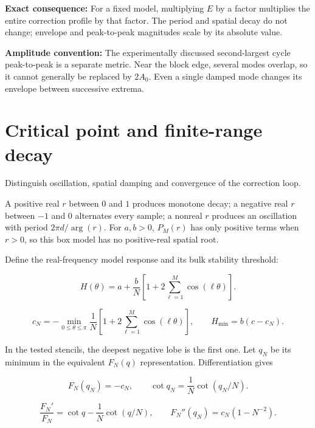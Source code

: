 \documentclass[10pt,a4paper]{article}
\newcommand{\subtitle}[1]{%
  {\small\color{muted}#1\par}\medskip}
\newcommand{\smallnote}[1]{%
  {\small #1\par}}
\begin{document}
\textbf{Exact consequence:}
For a fixed model, multiplying $E$ by a factor
multiplies the entire correction profile by
that factor.
The period and spatial decay do not change;
envelope and peak-to-peak magnitudes scale by
its absolute value.

\smallnote{
\textbf{Amplitude convention:}
The experimentally discussed second-largest cycle
peak-to-peak is a separate metric.
Near the block edge, several modes overlap,
so it cannot generally be replaced by $2A_0$.
Even a single damped mode changes its envelope
between successive extrema.
}

\clearpage
\section{Critical point and finite-range decay}
\subtitle{Distinguish oscillation, spatial damping and
convergence of the correction loop.}

A positive real $r$ between $0$ and $1$ produces
monotone decay; a negative real $r$ between $-1$
and $0$ alternates every sample; a nonreal $r$
produces an oscillation with period
$2\pi d/\arg(r)$.
For $a,b>0$, $P_M(r)$ has only positive terms
when $r>0$, so this box model has no positive-real
spatial root.

Define the real-frequency model response and
its bulk stability threshold:

\begin{equation}
H(\theta)
=
a+\frac{b}{N}
\left[
1+2\sum_{\ell=1}^{M}\cos(\ell\theta)
\right].
\end{equation}

\begin{equation}
c_N
=
-\min_{0\leq\theta\leq\pi}
\frac{1}{N}
\left[
1+2\sum_{\ell=1}^{M}\cos(\ell\theta)
\right],
\qquad
H_{\min}=b(c-c_N).
\end{equation}

In the tested stencils, the deepest negative lobe
is the first one.
Let $q_N$ be its minimum in the equivalent
$F_N(q)$ representation.
Differentiation gives

\begin{equation}
F_N(q_N)=-c_N,
\qquad
\cot q_N=\frac{1}{N}\cot(q_N/N).
\end{equation}

\begin{equation}
\frac{F_N'}{F_N}
=
\cot q-\frac{1}{N}\cot(q/N),
\qquad
F_N''(q_N)=c_N(1-N^{-2}).
\end{equation}
\end{document}
